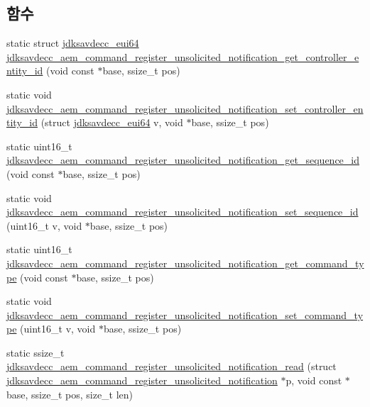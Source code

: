 \subsection*{함수}
\begin{DoxyCompactItemize}
\item 
static struct \hyperlink{structjdksavdecc__eui64}{jdksavdecc\+\_\+eui64} \hyperlink{group__command__register__unsolicited__notification_gac6b19ad324e789d53ead772b5a44b161}{jdksavdecc\+\_\+aem\+\_\+command\+\_\+register\+\_\+unsolicited\+\_\+notification\+\_\+get\+\_\+controller\+\_\+entity\+\_\+id} (void const $\ast$base, ssize\+\_\+t pos)
\item 
static void \hyperlink{group__command__register__unsolicited__notification_ga434d2acb3c0631a980b861f71a153730}{jdksavdecc\+\_\+aem\+\_\+command\+\_\+register\+\_\+unsolicited\+\_\+notification\+\_\+set\+\_\+controller\+\_\+entity\+\_\+id} (struct \hyperlink{structjdksavdecc__eui64}{jdksavdecc\+\_\+eui64} v, void $\ast$base, ssize\+\_\+t pos)
\item 
static uint16\+\_\+t \hyperlink{group__command__register__unsolicited__notification_ga21065ff354fb7f841b6fc0c7e708f948}{jdksavdecc\+\_\+aem\+\_\+command\+\_\+register\+\_\+unsolicited\+\_\+notification\+\_\+get\+\_\+sequence\+\_\+id} (void const $\ast$base, ssize\+\_\+t pos)
\item 
static void \hyperlink{group__command__register__unsolicited__notification_ga558db5ec2b66315eadbaea836978f30c}{jdksavdecc\+\_\+aem\+\_\+command\+\_\+register\+\_\+unsolicited\+\_\+notification\+\_\+set\+\_\+sequence\+\_\+id} (uint16\+\_\+t v, void $\ast$base, ssize\+\_\+t pos)
\item 
static uint16\+\_\+t \hyperlink{group__command__register__unsolicited__notification_ga0f862824b7f24d0820a0f4fce31dc312}{jdksavdecc\+\_\+aem\+\_\+command\+\_\+register\+\_\+unsolicited\+\_\+notification\+\_\+get\+\_\+command\+\_\+type} (void const $\ast$base, ssize\+\_\+t pos)
\item 
static void \hyperlink{group__command__register__unsolicited__notification_gadfa19b7867d88d2d1282e80ffc3bc5d1}{jdksavdecc\+\_\+aem\+\_\+command\+\_\+register\+\_\+unsolicited\+\_\+notification\+\_\+set\+\_\+command\+\_\+type} (uint16\+\_\+t v, void $\ast$base, ssize\+\_\+t pos)
\item 
static ssize\+\_\+t \hyperlink{group__command__register__unsolicited__notification_gad9c6cd62a09693dfecd5a7f5604d4af9}{jdksavdecc\+\_\+aem\+\_\+command\+\_\+register\+\_\+unsolicited\+\_\+notification\+\_\+read} (struct \hyperlink{structjdksavdecc__aem__command__register__unsolicited__notification}{jdksavdecc\+\_\+aem\+\_\+command\+\_\+register\+\_\+unsolicited\+\_\+notification} $\ast$p, void const $\ast$base, ssize\+\_\+t pos, size\+\_\+t len)

\end{DoxyCompactItemize}
